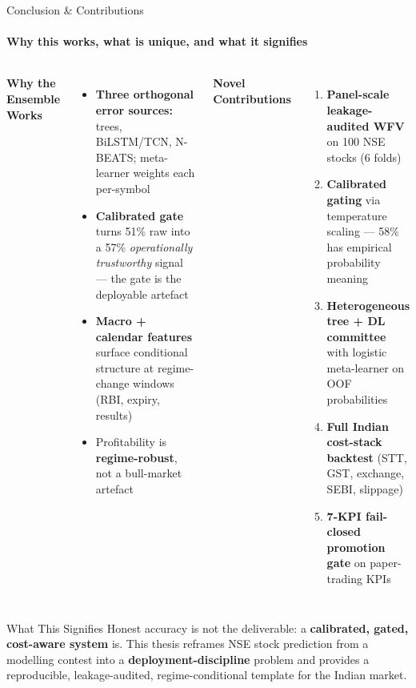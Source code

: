 \documentclass[10pt,aspectratio=43]{beamer}
\newcommand{\gd}[1]{\textcolor{secondary}{\textbf{#1}}}
\begin{document}
\begin{frame}{Conclusion \& Contributions}
  \framesubtitle{Why this works, what is unique, and what it signifies}
  \begin{columns}[T]
      \gd{\textbf{Why the Ensemble Works}}
      \begin{itemize}\itemsep1pt\footnotesize
        \item \textbf{Three orthogonal error sources:} trees, BiLSTM/TCN, N-BEATS; meta-learner weights each per-symbol
        \item \textbf{Calibrated gate} turns 51\% raw into a 57\% \emph{operationally trustworthy} signal --- the gate is the deployable artefact
        \item \textbf{Macro + calendar features} surface conditional structure at regime-change windows (RBI, expiry, results)
        \item Profitability is \textbf{regime-robust}, not a bull-market artefact
      \end{itemize}
      \gd{\textbf{Novel Contributions}}
      \begin{enumerate}\itemsep1pt\footnotesize
        \item \textbf{Panel-scale leakage-audited WFV} on 100 NSE stocks (6 folds)
        \item \textbf{Calibrated gating} via temperature scaling --- 58\% has empirical probability meaning
        \item \textbf{Heterogeneous tree + DL committee} with logistic meta-learner on OOF probabilities
        \item \textbf{Full Indian cost-stack backtest} (STT, GST, exchange, SEBI, slippage)
        \item \textbf{7-KPI fail-closed promotion gate} on paper-trading KPIs
      \end{enumerate}
  \end{columns}
  \vspace{0.20cm}
  \begin{exampleblock}{What This Signifies}
    \scriptsize
    Honest accuracy is not the deliverable: a \textbf{calibrated, gated, cost-aware system} is. This thesis reframes NSE stock prediction from a modelling contest into a \textbf{deployment-discipline} problem and provides a reproducible, leakage-audited, regime-conditional template for the Indian market.
  \end{exampleblock}
\end{frame}
\end{document}

